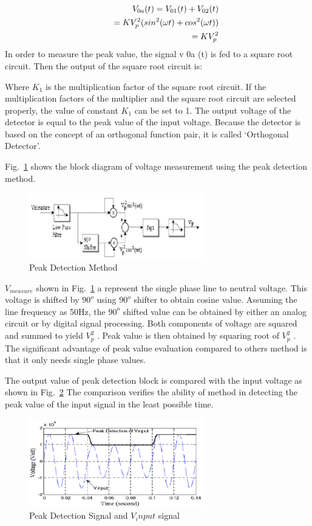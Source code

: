 \documentclass[journal,twoside]{IEEEtran}
\begin{document}
\begin{align}
V_{0a}(t) = V_{01}(t)+ V_{02}(t)\notag\\
\qquad = KV_p^2 (sin^2(\omega t) + cos^2 (\omega t) )\notag\\
\qquad = KV_p^2
\end{align}
In order to measure the peak value, the signal v 0a (t) is
fed to a square root circuit. Then the output of the square
root circuit is:

Where $K_1$ is the multiplication factor of the square root
circuit. If the multiplication factors of the multiplier and
the square root circuit are selected properly, the value of
constant $K_1$ can be set to 1. The output voltage of the
detector is equal to the peak value of the input voltage.
Because the detector is based on the concept of an
orthogonal function pair, it is called \lq Orthogonal
Detector\rq.

Fig.~\ref{f2} shows the block diagram of voltage measurement
using the peak detection method.


\begin{figure}[!ht]
\centering
\includegraphics[width=3in]{2}
\caption{Peak Detection Method}
\label{f2}
\end{figure}


$V_{measure}$ shown in Fig.~\ref{f2} a represent the single phase line
to neutral voltage. This voltage is shifted by $90^o$ using
$90^o$ shifter to obtain cosine value. Assuming the line
frequency as 50Hz, the $90^o$ shifted value can be obtained
by either an analog circuit or by digital signal
processing. Both components of voltage are squared and
summed to yield $V_p^2$ . Peak value is then obtained by
squaring root of $V_p^2$ . The significant advantage of peak
value evaluation compared to others method is that it
only needs single phase values.

The output value of peak detection block is compared
with the input voltage as shown in Fig.~\ref{f3} The comparison
verifies the ability of method in detecting the peak value
of the input signal in the least possible time.
\begin{figure}[!ht]
\centering
\includegraphics[width=3in]{3}
\caption{Peak Detection Signal and $V_input$ signal}
\label{f3}
\end{figure}
\end{document}
